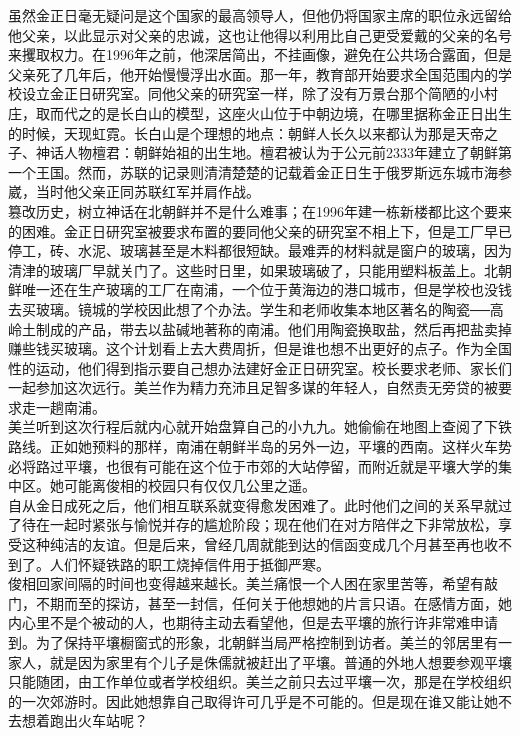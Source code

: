 \begin{multicols}{\theparacolNo}
虽然金正日毫无疑问是这个国家的最高领导人，但他仍将国家主席的职位永远留给他父亲，以此显示对父亲的忠诚，这也让他得以利用比自己更受爱戴的父亲的名号来攫取权力。在1996年之前，他深居简出，不挂画像，避免在公共场合露面，但是父亲死了几年后，他开始慢慢浮出水面。那一年，教育部开始要求全国范围内的学校设立金正日研究室。同他父亲的研究室一样，除了没有万景台那个简陋的小村庄，取而代之的是长白山的模型，这座火山位于中朝边境，在哪里据称金正日出生的时候，天现虹霓。长白山是个理想的地点：朝鲜人长久以来都认为那是天帝之子、神话人物檀君：朝鲜始祖的出生地。檀君被认为于公元前2333年建立了朝鲜第一个王国。然而，苏联的记录则清清楚楚的记载着金正日生于俄罗斯远东城市海参崴，当时他父亲正同苏联红军并肩作战。\\

篡改历史，树立神话在北朝鲜并不是什么难事；在1996年建一栋新楼都比这个要来的困难。金正日研究室被要求布置的要同他父亲的研究室不相上下，但是工厂早已停工，砖、水泥、玻璃甚至是木料都很短缺。最难弄的材料就是窗户的玻璃，因为清津的玻璃厂早就关门了。这些时日里，如果玻璃破了，只能用塑料板盖上。北朝鲜唯一还在生产玻璃的工厂在南浦，一个位于黄海边的港口城市，但是学校也没钱去买玻璃。镜城的学校因此想了个办法。学生和老师收集本地区著名的陶瓷──高岭土制成的产品，带去以盐碱地著称的南浦。他们用陶瓷换取盐，然后再把盐卖掉赚些钱买玻璃。这个计划看上去大费周折，但是谁也想不出更好的点子。作为全国性的运动，他们得到指示要自己想办法建好金正日研究室。校长要求老师、家长们一起参加这次远行。美兰作为精力充沛且足智多谋的年轻人，自然责无旁贷的被要求走一趟南浦。\\

美兰听到这次行程后就内心就开始盘算自己的小九九。她偷偷在地图上查阅了下铁路线。正如她预料的那样，南浦在朝鲜半岛的另外一边，平壤的西南。这样火车势必将路过平壤，也很有可能在这个位于市郊的大站停留，而附近就是平壤大学的集中区。她可能离俊相的校园只有仅仅几公里之遥。\\

自从金日成死之后，他们相互联系就变得愈发困难了。此时他们之间的关系早就过了待在一起时紧张与愉悦并存的尴尬阶段；现在他们在对方陪伴之下非常放松，享受这种纯洁的友谊。但是后来，曾经几周就能到达的信函变成几个月甚至再也收不到了。人们怀疑铁路的职工烧掉信件用于抵御严寒。\\

俊相回家间隔的时间也变得越来越长。美兰痛恨一个人困在家里苦等，希望有敲门，不期而至的探访，甚至一封信，任何关于他想她的片言只语。在感情方面，她内心里不是个被动的人，也期待主动去看望他，但是去平壤的旅行许非常难申请到。为了保持平壤橱窗式的形象，北朝鲜当局严格控制到访者。美兰的邻居里有一家人，就是因为家里有个儿子是侏儒就被赶出了平壤。普通的外地人想要参观平壤只能随团，由工作单位或者学校组织。美兰之前只去过平壤一次，那是在学校组织的一次郊游时。因此她想靠自己取得许可几乎是不可能的。但是现在谁又能让她不去想着跑出火车站呢？\\


\end{multicols}
